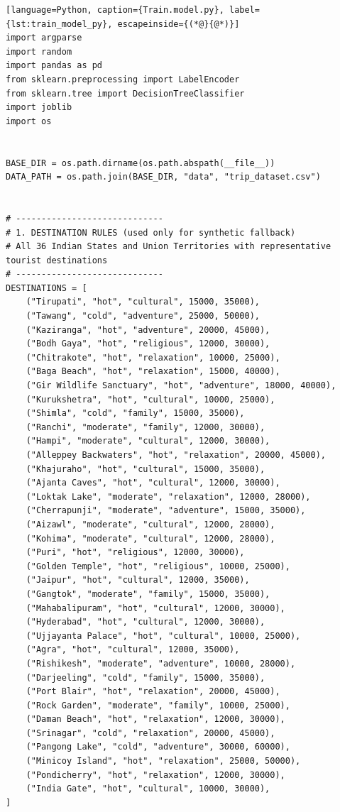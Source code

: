 \begin{lstlisting}[language=Python, caption={Train.model.py}, label={lst:train_model_py}, escapeinside={(*@}{@*)}]
import argparse
import random
import pandas as pd
from sklearn.preprocessing import LabelEncoder
from sklearn.tree import DecisionTreeClassifier
import joblib
import os


BASE_DIR = os.path.dirname(os.path.abspath(__file__))
DATA_PATH = os.path.join(BASE_DIR, "data", "trip_dataset.csv")


# -----------------------------
# 1. DESTINATION RULES (used only for synthetic fallback)
# All 36 Indian States and Union Territories with representative tourist destinations
# -----------------------------
DESTINATIONS = [
    ("Tirupati", "hot", "cultural", 15000, 35000),
    ("Tawang", "cold", "adventure", 25000, 50000),
    ("Kaziranga", "hot", "adventure", 20000, 45000),
    ("Bodh Gaya", "hot", "religious", 12000, 30000),
    ("Chitrakote", "hot", "relaxation", 10000, 25000),
    ("Baga Beach", "hot", "relaxation", 15000, 40000),
    ("Gir Wildlife Sanctuary", "hot", "adventure", 18000, 40000),
    ("Kurukshetra", "hot", "cultural", 10000, 25000),
    ("Shimla", "cold", "family", 15000, 35000),
    ("Ranchi", "moderate", "family", 12000, 30000),
    ("Hampi", "moderate", "cultural", 12000, 30000),
    ("Alleppey Backwaters", "hot", "relaxation", 20000, 45000),
    ("Khajuraho", "hot", "cultural", 15000, 35000),
    ("Ajanta Caves", "hot", "cultural", 12000, 30000),
    ("Loktak Lake", "moderate", "relaxation", 12000, 28000),
    ("Cherrapunji", "moderate", "adventure", 15000, 35000),
    ("Aizawl", "moderate", "cultural", 12000, 28000),
    ("Kohima", "moderate", "cultural", 12000, 28000),
    ("Puri", "hot", "religious", 12000, 30000),
    ("Golden Temple", "hot", "religious", 10000, 25000),
    ("Jaipur", "hot", "cultural", 12000, 35000),
    ("Gangtok", "moderate", "family", 15000, 35000),
    ("Mahabalipuram", "hot", "cultural", 12000, 30000),
    ("Hyderabad", "hot", "cultural", 12000, 30000),
    ("Ujjayanta Palace", "hot", "cultural", 10000, 25000),
    ("Agra", "hot", "cultural", 12000, 35000),
    ("Rishikesh", "moderate", "adventure", 10000, 28000),
    ("Darjeeling", "cold", "family", 15000, 35000),
    ("Port Blair", "hot", "relaxation", 20000, 45000),
    ("Rock Garden", "moderate", "family", 10000, 25000),
    ("Daman Beach", "hot", "relaxation", 12000, 30000),
    ("Srinagar", "cold", "relaxation", 20000, 45000),
    ("Pangong Lake", "cold", "adventure", 30000, 60000),
    ("Minicoy Island", "hot", "relaxation", 25000, 50000),
    ("Pondicherry", "hot", "relaxation", 12000, 30000),
    ("India Gate", "hot", "cultural", 10000, 30000),
]



\end{lstlisting}
